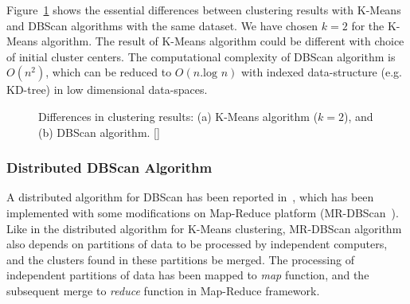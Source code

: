 \noindent
Figure~\ref{fig:bigdata:kmeans-dbscan} shows the essential differences between clustering results with K-Means and DBScan algorithms with
the same dataset. We have chosen $k = 2$ for the K-Means algorithm. The result of K-Means algorithm could be different with choice 
of initial cluster centers. The computational complexity of DBScan algorithm is $O(n^2)$, which can be reduced to $O(n.\text{log } n)$ with
indexed data-structure (e.g. KD-tree) in low dimensional data-spaces.

\begin{figure}[htbp!]
	\caption{Differences in clustering results: (a) K-Means algorithm ($k=2$), and (b) DBScan algorithm. 
		[]}
	\label{fig:bigdata:kmeans-dbscan}
\end{figure}

\subsubsection*{Distributed DBScan Algorithm}
\label{sec:bigdata:mrdbscan}

A distributed algorithm for DBScan has been reported in~\citep{Xu:1999}, which has been implemented with some modifications on Map-Reduce
platform (MR-DBScan~\citep{He:2011}). Like in the distributed algorithm for K-Means clustering, MR-DBScan algorithm also depends
on partitions of data to be processed by independent computers, and the clusters found in these partitions be merged. The processing of 
independent partitions of data has been mapped to {\em map} function, and the subsequent merge to {\em reduce} function in Map-Reduce 
framework.


